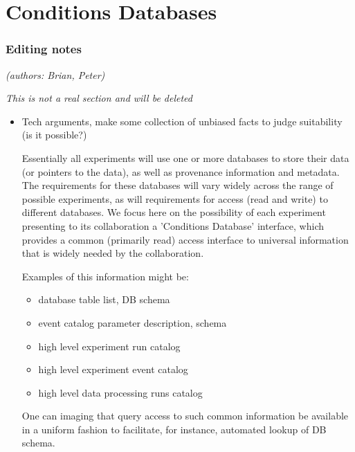 \section{Conditions Databases}

\subsubsection{Editing notes}

\textit{(authors: Brian, Peter)}

\textit{This is not a real section and will be deleted}


\begin{itemize}
\item Tech arguments, make some collection of unbiased facts to judge suitability (is it possible?)

	Essentially all experiments will use one or more databases to
	store their data (or pointers to the data), as well as provenance 
	information and metadata.  The requirements for these databases will
	vary widely across the range of possible experiments, as will
	requirements for access (read and write) to different databases.  
	We focus here on the possibility of each experiment presenting
	to its collaboration a 'Conditions Database' interface, which
	provides a common (primarily read) access interface to universal
	information that is widely needed by the collaboration.

	Examples of this information might be:
	\begin{itemize}
	\item database table list, DB schema
	\item event catalog parameter description, schema
	\item high level experiment run catalog
	\item high level experiment event catalog
	\item high level data processing runs catalog
	\end{itemize}

	One can imaging that query access to such common information be
	available in a uniform fashion to facilitate, for instance,
	automated lookup of DB schema.  


\end{itemize}
